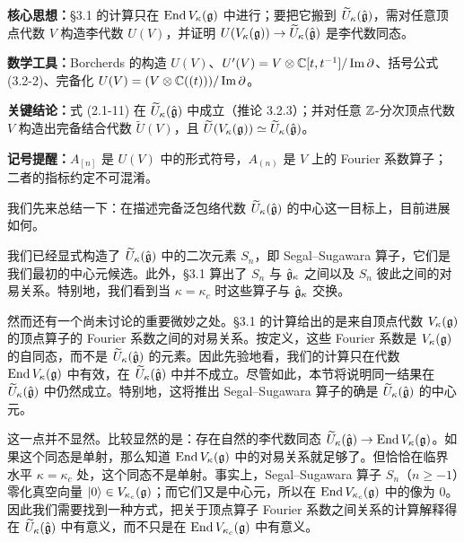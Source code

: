 \begin{keypoints}
    \item \textbf{核心思想：}§3.1 的计算只在 $\operatorname{End} V_\kappa(\mathfrak{g})$ 中进行；要把它搬到 $\widetilde U_\kappa(\hat{\mathfrak{g}})$，需对任意顶点代数 $V$ 构造李代数 $U(V)$，并证明 $U(V_\kappa(\mathfrak{g}))\to\widetilde U_\kappa(\hat{\mathfrak{g}})$ 是李代数同态。
    \item \textbf{数学工具：}Borcherds 的构造 $U(V)$、$U'(V)=V\otimes\mathbb{C}[t,t^{-1}]/\operatorname{Im}\partial$、括号公式 (3.2-2)、完备化 $U(V)=(V\otimes\mathbb{C}((t)))/\operatorname{Im}\partial$。
    \item \textbf{关键结论：}式 (2.1-11) 在 $\widetilde U_\kappa(\hat{\mathfrak{g}})$ 中成立（推论 3.2.3）；并对任意 $\mathbb{Z}$-分次顶点代数 $V$ 构造出完备结合代数 $\widetilde U(V)$，且 $\widetilde U(V_\kappa(\mathfrak{g}))\simeq\widetilde U_\kappa(\hat{\mathfrak{g}})$。
    \item \textbf{记号提醒：}$A_{[n]}$ 是 $U(V)$ 中的形式符号，$A_{(n)}$ 是 $V$ 上的 Fourier 系数算子；二者的指标约定不可混淆。
\end{keypoints}

我们先来总结一下：在描述完备泛包络代数 $\widetilde U_\kappa(\hat{\mathfrak{g}})$ 的中心这一目标上，目前进展如何。

我们已经显式构造了 $\widetilde U_\kappa(\hat{\mathfrak{g}})$ 中的二次元素 $S_n$，即 Segal--Sugawara 算子，它们是我们最初的中心元候选。此外，§3.1 算出了 $S_n$ 与 $\hat{\mathfrak{g}}_\kappa$ 之间以及 $S_n$ 彼此之间的对易关系。特别地，我们看到当 $\kappa=\kappa_c$ 时这些算子与 $\hat{\mathfrak{g}}_\kappa$ 交换。


然而还有一个尚未讨论的重要微妙之处。§3.1 的计算给出的是来自顶点代数 $V_\kappa(\mathfrak{g})$ 的顶点算子的 Fourier 系数之间的对易关系。按定义，这些 Fourier 系数是 $V_\kappa(\mathfrak{g})$ 的自同态，而不是 $\widetilde U_\kappa(\hat{\mathfrak{g}})$ 的元素。因此先验地看，我们的计算只在代数 $\operatorname{End} V_\kappa(\mathfrak{g})$ 中有效，在 $\widetilde U_\kappa(\hat{\mathfrak{g}})$ 中并不成立。尽管如此，本节将说明同一结果在 $\widetilde U_\kappa(\hat{\mathfrak{g}})$ 中仍然成立。特别地，这将推出 Segal--Sugawara 算子的确是 $\widetilde U_\kappa(\hat{\mathfrak{g}})$ 的中心元。

这一点并不显然。比较显然的是：存在自然的李代数同态 $\widetilde U_\kappa(\hat{\mathfrak{g}})\to\operatorname{End} V_\kappa(\mathfrak{g})$。如果这个同态是单射，那么知道 $\operatorname{End} V_\kappa(\mathfrak{g})$ 中的对易关系就足够了。但恰恰在临界水平 $\kappa=\kappa_c$ 处，这个同态不是单射。事实上，Segal--Sugawara 算子 $S_n$（$n\ge-1$）零化真空向量 $|0\rangle\in V_{\kappa_c}(\mathfrak{g})$；而它们又是中心元，所以在 $\operatorname{End} V_{\kappa_c}(\mathfrak{g})$ 中的像为 $0$。因此我们需要找到一种方式，把关于顶点算子 Fourier 系数之间关系的计算解释得在 $\widetilde U_\kappa(\hat{\mathfrak{g}})$ 中有意义，而不只是在 $\operatorname{End} V_{\kappa_c}(\mathfrak{g})$ 中有意义。

